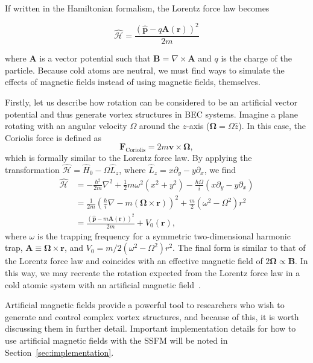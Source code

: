 If written in the Hamiltonian formalism, the Lorentz force law becomes

\begin{equation}
\mathcal{\hat{H}} = \frac{(\mathbf{\hat p} - q\mathbf{A}(\mathbf{r}))^2}{2m}
\end{equation}

\noindent where $\mathbf{A}$ is a vector potential such that $\mathbf{B} = \nabla \times \mathbf{A}$ and $q$ is the charge of the particle.
Because cold atoms are neutral, we must find ways to simulate the effects of magnetic fields instead of using magnetic fields, themselves.

Firstly, let us describe how rotation can be considered to be an artificial vector potential and thus generate vortex structures in BEC systems.
Imagine a plane rotating with an angular velocity $\Omega$ around the $z$-axis ($\mathbf{\Omega} = \Omega \hat z$). 
In this case, the Coriolis force is defined as
\begin{equation}
\mathbf{F}_{\text{Coriolis}} = 2m \mathbf{v} \times \mathbf{\Omega},
\end{equation}
which is formally similar to the Lorentz force law.
By applying the transformation $\mathcal{\hat H} = \hat H_0 - \Omega \hat L_z$, where $\hat L_z = x\partial_y - y\partial_x$, we find~\cite{bhat2008}
\begin{equation}
\begin{split}
\mathcal{\hat H} &= -\frac{\hbar^2}{2m}\nabla^2 + \frac 1 2 m \omega^2(x^2 + y^2) - \frac{\hbar \Omega}{i}(x\partial_y - y\partial_x) \\
 &= \frac{1}{2m}\left(\frac{\hbar}{i}\nabla - m(\mathbf{\Omega} \times \mathbf{r})\right)^2 + \frac m 2 \left( \omega^2 - \Omega^2 \right)r^2 \\
 &= \frac{(\hat{\mathbf{p}}-m\mathbf{A}(\mathbf{r}))^2}{2m}+ V_0(\mathbf{r}),
\end{split}
\end{equation}
where $\omega$ is the trapping frequency for a symmetric two-dimensional harmonic trap, $\mathbf{A} \equiv \mathbf{\Omega} \times \mathbf{r}$, and $V_0 = m/2 \left( \omega^2 - \Omega^2 \right)r^2$.
The final form is similar to that of the Lorentz force law and coincides with an effective magnetic field of $2 \mathbf \Omega \propto \mathbf B$.
In this way, we may recreate the rotation expected from the Lorentz force law in a cold atomic system with an artificial magnetic field~\cite{peshkin1989, madison2000, abo2001}.

Artificial magnetic fields provide a powerful tool to researchers who wish to generate and control complex vortex structures, and because of this, it is worth discussing them in further detail.
Important implementation details for how to use artificial magnetic fields with the SSFM will be noted in Section~\ref{sec:implementation}.

